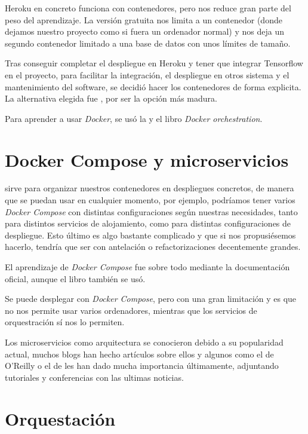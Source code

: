 Heroku en concreto funciona con contenedores, pero nos reduce gran parte del peso del aprendizaje. La versión gratuita nos limita a un contenedor (donde dejamos nuestro proyecto como si fuera un ordenador normal) y nos deja un segundo contenedor limitado a una base de datos  con unos límites de tamaño. 

Tras conseguir completar el despliegue en Heroku y tener que integrar Tensorflow en el proyecto, para facilitar la integración, el despliegue en otros sistema y el mantenimiento del software, se decidió hacer los contenedores de forma explicita. La alternativa elegida fue , por ser la opción más madura. 

Para aprender a usar \emph{Docker}, se usó la  y el libro \emph{Docker orchestration}\cite{ran17}.

\section{Docker Compose y microservicios}

 sirve para organizar nuestros contenedores en despliegues concretos, de manera que se puedan usar en cualquier momento, por ejemplo, podríamos tener varios \emph{Docker Compose} con distintas configuraciones según nuestras necesidades, tanto para distintos servicios de alojamiento, como para distintas configuraciones de despliegue. Esto último es algo bastante complicado y que si nos propusiésemos hacerlo, tendría que ser con antelación o refactorizaciones decentemente grandes.

El aprendizaje de \emph{Docker Compose} fue sobre todo mediante la documentación oficial, aunque el libro \cite{ran17} también se usó.

Se puede desplegar con \emph{Docker Compose}, pero con una gran limitación y es que no nos permite usar varios ordenadores, mientras que los servicios de orquestración sí nos lo permiten.

Los microservicios como arquitectura se conocieron debido a su popularidad actual, muchos blogs han hecho artículos sobre ellos y algunos  como el de O'Reilly o el de  les han dado mucha importancia últimamente, adjuntando tutoriales y conferencias con las ultimas noticias.


\section{Orquestación}

